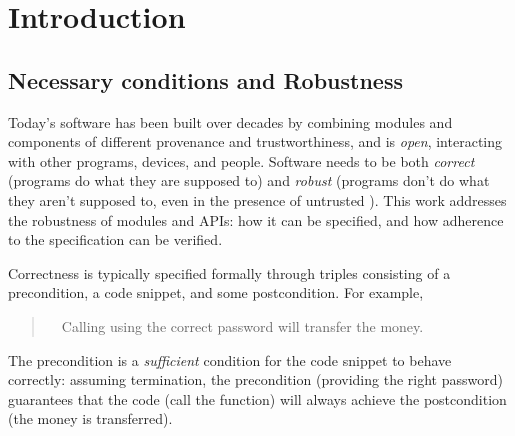 \section{Introduction}
\label{s:intro}

\subsection{Necessary conditions and Robustness} 
Today's   software has been built 
over decades by combining modules and components of
different provenance and 
trustworthiness, and
is \emph{open}, interacting with other programs, devices, and people.
{Software needs} to be both  {\emph{correct}} ({programs do what they are supposed to}) and  %
{\emph{robust}} ({programs don't do what they aren't supposed to, even in the presence of untrusted }). %
 {This work  addresses the robustness of modules and APIs: {how it can be specified, and how adherence to the specification can be verified}.}

 {Correctness is} typically specified formally 
 through  triples consisting of a  precondition, a code snippet, and some
 postcondition. 
 For example, 
 \begin{quote}
\Scorrect\ \ Calling  using the correct password will transfer the money.
\end{quote}
The precondition is a \emph{sufficient} condition for the {code snippet to behave correctly}: 
assuming termination, the precondition (\eg providing the right 
password) guarantees that
the code (\eg call the  function)
will always achieve the postcondition (the money is transferred).


    \vspace{.03in}
 
